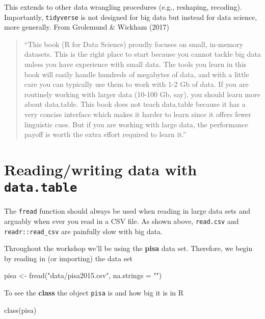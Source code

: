 \documentclass[
]{book}
\newenvironment{Shaded}{\begin{snugshade}}{\end{snugshade}}
\newcommand{\AttributeTok}[1]{\textcolor[rgb]{0.77,0.63,0.00}{#1}}
\newcommand{\FunctionTok}[1]{\textcolor[rgb]{0.00,0.00,0.00}{#1}}
\newcommand{\NormalTok}[1]{#1}
\newcommand{\OtherTok}[1]{\textcolor[rgb]{0.56,0.35,0.01}{#1}}
\newcommand{\StringTok}[1]{\textcolor[rgb]{0.31,0.60,0.02}{#1}}
\begin{document}
This extends to other data wrangling procedures (e.g., reshaping, recoding). Importantly, \texttt{tidyverse} is not designed for big data but instead for data science, more generally. From Grolemund \& Wickham (2017)

\begin{quote}
``This book (R for Data Science) proudly focuses on small, in-memory datasets. This is the right place to start because you cannot tackle big data unless you have experience with small data. The tools you learn in this book will easily handle hundreds of megabytes of data, and with a little care you can typically use them to work with 1-2 Gb of data. If you are routinely working with larger data (10-100 Gb, say), you should learn more about data.table. This book does not teach data.table because it has a very concise interface which makes it harder to learn since it offers fewer linguistic cues. But if you are working with large data, the performance payoff is worth the extra effort required to learn it.''
\end{quote}

\hypertarget{readingwriting-data-with-data.table}{%
\section{\texorpdfstring{Reading/writing data with \texttt{data.table}}{Reading/writing data with data.table}}\label{readingwriting-data-with-data.table}}

The \texttt{fread} function should always be used when reading in large data sets and arguably when ever you read in a CSV file. As shown above, \texttt{read.csv} and \texttt{readr::read\_csv} are painfully slow with big data.

Throughout the workshop we'll be using the \textbf{pisa} data set. Therefore, we begin by reading in (or importing) the data set

\begin{Shaded}
\begin{Highlighting}[]
\NormalTok{pisa }\OtherTok{\textless{}{-}} \FunctionTok{fread}\NormalTok{(}\StringTok{"data/pisa2015.csv"}\NormalTok{, }\AttributeTok{na.strings =} \StringTok{""}\NormalTok{)}
\end{Highlighting}
\end{Shaded}

To see the \textbf{class} the object \texttt{pisa} is and how big it is in R

\begin{Shaded}
\begin{Highlighting}[]
\FunctionTok{class}\NormalTok{(pisa)}
\end{Highlighting}
\end{Shaded}
\end{document}
